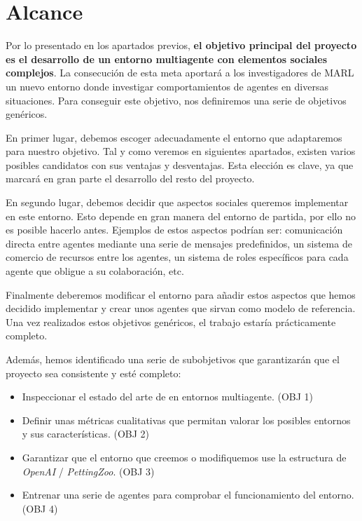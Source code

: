 \section{Alcance}
Por lo presentado en los apartados previos, \textbf{el objetivo principal del proyecto es el desarrollo de un entorno multiagente con elementos sociales complejos}. La consecución de esta meta aportará a los investigadores de MARL un nuevo entorno donde investigar comportamientos de agentes en diversas situaciones. Para conseguir este objetivo, nos definiremos una serie de objetivos genéricos.

En primer lugar, debemos escoger adecuadamente el entorno que adaptaremos para nuestro objetivo. Tal y como veremos en siguientes apartados, existen varios posibles candidatos con sus ventajas y desventajas. Esta elección es clave, ya que marcará en gran parte el desarrollo del resto del proyecto. 

En segundo lugar, debemos decidir que aspectos sociales queremos implementar en este entorno. Esto depende en gran manera del entorno de partida, por ello no es posible hacerlo antes. Ejemplos de estos aspectos podrían ser: comunicación directa entre agentes mediante una serie de mensajes predefinidos, un sistema de comercio de recursos entre los agentes, un sistema de roles específicos para cada agente que obligue a su colaboración, etc. 

Finalmente deberemos modificar el entorno para añadir estos aspectos que hemos decidido implementar y crear unos agentes que sirvan como modelo de referencia. Una vez realizados estos objetivos genéricos, el trabajo estaría prácticamente completo. 

Además, hemos identificado una serie de subobjetivos que garantizarán que el proyecto sea consistente y esté completo:

\begin{itemize}
    \item Inspeccionar el estado del arte de en entornos multiagente. (OBJ 1)
    \item Definir unas métricas cualitativas que permitan valorar los posibles entornos y sus características. (OBJ 2)
    \item Garantizar que el entorno que creemos o modifiquemos use la estructura de \textit{OpenAI} / \textit{PettingZoo}. (OBJ 3)
    \item Entrenar una serie de agentes para comprobar el funcionamiento del entorno. (OBJ 4)
\end{itemize}
 
